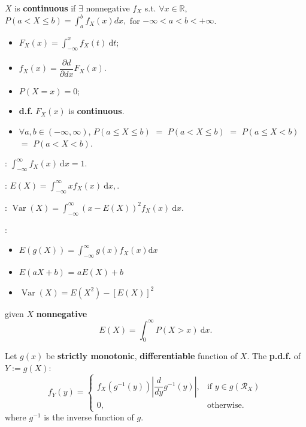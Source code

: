  \(X\) is \textbf{continuous} if $\exists$
nonnegative \(f_X\) s.t. $\forall x \in \mathbb{R}$,  
\(P(a < X \leq b) = \int_a^b f_X(x)dx,\)
for \(-\infty < a < b < +\infty\). 
\begin{multicols}{2}
\begin{itemize}
  \item \(F_X(x) = \int_{-\infty}^{x}f_X(t)\ \mathrm{d}t\);
  \item \(f_X(x) = \dfrac{\partial{d}}{\partial{d}x}F_X(x)\).
\end{itemize}
\end{multicols}
\begin{multicols}{2}
\begin{itemize}
  \item \(P(X = x) = 0\);
  \item \textbf{d.f.} \(F_X(x)\) is \textbf{continuous}.
\end{itemize}
\end{multicols}
\begin{itemize}
  \item \(\forall a, b \in (-\infty, \infty)\), \(P(a \leq X \leq b)\) \(=\)
    \(P(a < X \leq b)\) \(=\) \(P(a \leq X < b)\) \(=\) \(P(a < X < b)\).
\end{itemize}

: 
\(\int_{-\infty}^{\infty}f_X(x)\ \mathrm{d}x = 1\).

: \(E(X) = \int_{-\infty}^{\infty}xf_X(x)\ \mathrm{d}x,\).

: \(\operatorname{Var}(X) =
\int_{-\infty}^{\infty}(x-E(X))^2f_X(x)\ \mathrm{d}x\).

: 
\begin{multicols}{2}[\setlength\columnsep{0pt}]
\begin{itemize}
  \item \(E(g(X)) = \int_{-\infty}^{\infty}g(x)f_X(x)\mathrm{d}x\)
  \item \(E(aX + b)\) = \(aE(X) + b\)
  \item \(\operatorname{Var}(X) = E(X^2) - [E(X)]^2\)
\end{itemize}
\end{multicols}

 given \(X\) \textbf{nonnegative} \tf
\[E(X) = \int_0^{\infty}P(X > x)\ \mathrm{d}x.\]

 Let \(g(x)\) be
\textbf{strictly monotonic}, \textbf{differentiable} function of \(X\). \tf 
The \textbf{p.d.f.} of \(Y := g(X)\):
\[f_Y(y) = \begin{cases}
  f_X(g^{-1}(y))\left|\dfrac{d}{dy}g^{-1}(y)\right|, & \text{if } y \in
  g(\mathcal{R}_X) \\
  0, & \text{otherwise}.
\end{cases}\]
where \(g^{-1}\) is the inverse function of \(g\).

